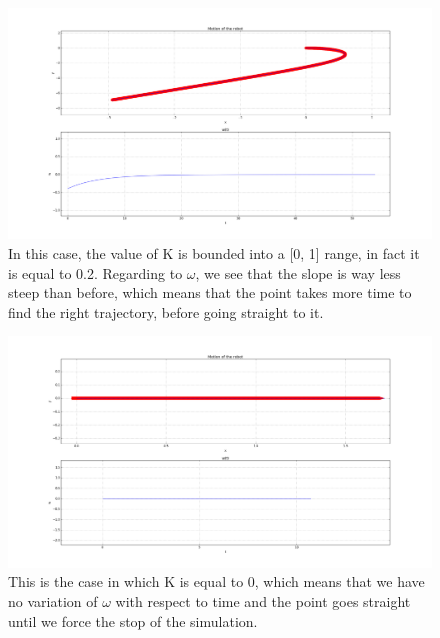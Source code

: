 \documentclass[a4paper,11pt,oneside]{book}
\begin{document}
\begin{figure}[H]
\centering
\hspace*{-2.3in}
\includegraphics[width=1.9\textwidth]{figs/simulations/6_2}
\caption[Simulation: K = 0.2]{In this case, the value of K is bounded into a [0, 1] range, in fact it is equal to 0.2. Regarding to $\omega$, we see that the slope is way less steep than before, which means that the point takes more time to find the right trajectory, before going straight to it.}
\end{figure}

\begin{figure}[H]
\centering
\hspace*{-2.3in}
\includegraphics[width=1.9\textwidth]{figs/simulations/4_2}
\caption[Simulation: K = 0]{This is the case in which K is equal to 0, which means that we have no variation of $\omega$ with respect to time and the point goes straight until we force the stop of the simulation.}
\end{figure}
\end{document}
